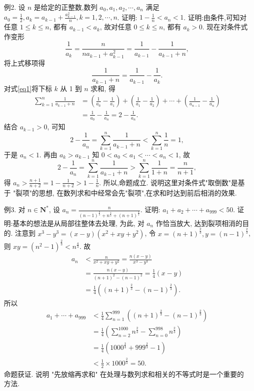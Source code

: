 例2. 设 $n$ 是给定的正整数,数列 $a_0, a_1, a_2, \cdots, a_n$ 满足 $a_0=\frac{1}{2}, a_k= a_{k-1}+\frac{a_{k-1}^2}{n}, k=1,2, \cdots, n$. 证明: $1-\frac{1}{n}<a_n<1$.
证明:由条件,可知对任意 $1 \leqslant k \leqslant n$, 都有 $a_{k-1}<a_k$, 故对任意 $0 \leqslant k \leqslant n$, 都有 $a_k>0$.
现在对条件式作变形
$$
\frac{1}{a_k}=\frac{n}{n a_{k-1}+a_{k-1}^2}=\frac{1}{a_{k-1}}-\frac{1}{a_{k-1}+n},
$$
将上式移项得
$$
\frac{1}{a_{k-1}+n}=\frac{1}{a_{k-1}}-\frac{1}{a_k} . \label{eq1}
$$
对式\ref{eq1}将下标 $k$ 从 1 到 $n$ 求和, 得
$$
\begin{aligned}
\sum_{k=1}^n \frac{1}{a_{k-1}+n} & =\left(\frac{1}{a_0}-\frac{1}{a_1}\right)+\left(\frac{1}{a_1}-\frac{1}{a_2}\right)+\cdots+\left(\frac{1}{a_{n-1}}-\frac{1}{a_n}\right) \\
& =\frac{1}{a_0}-\frac{1}{a_n}=2-\frac{1}{a_n} .
\end{aligned}
$$
结合 $a_{k-1}>0$, 可知
$$
2-\frac{1}{a_n}=\sum_{k=1}^n \frac{1}{a_{k-1}+n}<\sum_{k=1}^n \frac{1}{n}=1,
$$
于是 $a_n<1$.
再由 $a_k>a_{k-1}$ 知 $0<a_0<a_1<\cdots<a_n<1$, 故
$$
2-\frac{1}{a_n}=\sum_{k=1}^n \frac{1}{a_{k-1}+n}>\sum_{k=1}^n \frac{1}{1+n}=\frac{n}{n+1},
$$
得 $a_n>\frac{n+1}{n+2}=1-\frac{1}{n+2}>1-\frac{1}{n}$.
所以,命题成立.
说明这里对条件式"取倒数"是基于 "裂项"的思想, 在数列求和中经常会先"裂项",在求和时达到前后相消的效果.



例3. 对 $n \in \mathbf{N}^*$, 设 $a_n=\frac{n}{(n-1)^{\frac{4}{3}}+n^{\frac{4}{3}}+(n+1)^{\frac{4}{3}}}$. 证明: $a_1+ a_2+\cdots+a_{999}<50$.
证明:基本的想法是从局部往整体去处理, 为此, 对 $a_n$ 作恰当放大, 达到裂项相消的目的.
注意到 $x^3-y^3=(x-y)\left(x^2+x y+y^2\right)$, 令 $x=(n+1)^{\frac{2}{3}}, y=(n-1)^{\frac{2}{3}}$, 则 $x y=\left(n^2-1\right)^{\frac{2}{3}}<n^{\frac{4}{3}}$. 故
$$
\begin{aligned}
a_n & <\frac{n}{x^2+x y+y^2}=\frac{n(x-y)}{x^3-y^3} \\
& =\frac{n(x-y)}{(n+1)^2-(n-1)^2}=\frac{1}{4}(x-y) \\
& =\frac{1}{4}\left((n+1)^{\frac{2}{3}}-(n-1)^{\frac{2}{3}}\right) .
\end{aligned}
$$
所以
$$
\begin{aligned}
a_1+\cdots+a_{999} & <\frac{1}{4} \sum_{n=1}^{999}\left((n+1)^{\frac{2}{3}}-(n-1)^{\frac{2}{3}}\right) \\
& =\frac{1}{4}\left(\sum_{n=2}^{1000} n^{\frac{2}{3}}-\sum_{n=0}^{998} n^{\frac{2}{3}}\right) \\
& =\frac{1}{4}\left(1000^{\frac{2}{3}}+999^{\frac{2}{3}}-1\right) \\
& <\frac{1}{2} \times 1000^{\frac{2}{3}}=50 .
\end{aligned}
$$
命题获证.
说明 "先放缩再求和" 在处理与数列求和相关的不等式时是一个重要的方法.



